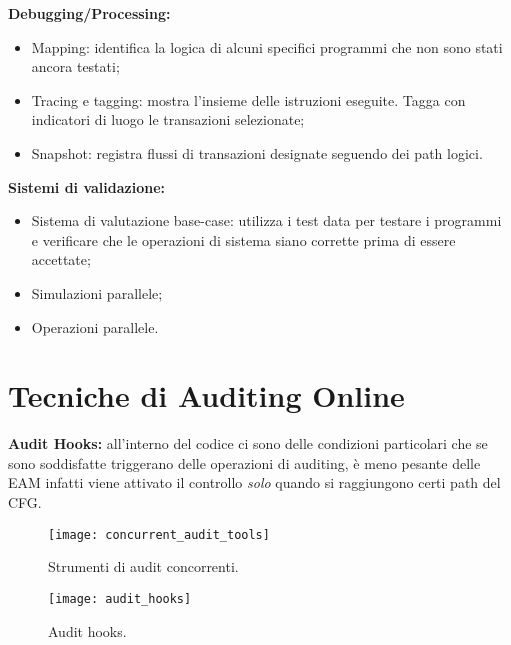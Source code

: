 \textbf{Debugging/Processing:}

\begin{itemize}
    \item Mapping: identifica la logica di alcuni specifici programmi che non
    sono stati ancora testati;
    \item Tracing e tagging: mostra l'insieme delle istruzioni eseguite. Tagga
    con indicatori di luogo le
    transazioni selezionate;
    \item Snapshot: registra flussi di transazioni designate seguendo dei path
    logici.
\end{itemize}

\textbf{Sistemi di validazione:}

\begin{itemize}
    \item Sistema di valutazione base-case: utilizza i test data per testare i
    programmi e verificare che
    le operazioni di sistema siano corrette prima di essere accettate;
    \item Simulazioni parallele;
    \item Operazioni parallele.
\end{itemize}

\section{Tecniche di Auditing Online}

\textbf{Audit Hooks:} all'interno del codice ci sono delle condizioni
particolari che se sono soddisfatte triggerano delle operazioni di auditing, è
meno pesante delle EAM infatti viene attivato il controllo \emph{solo} quando
si raggiungono certi path del CFG.

\begin{figure}[h!]
        \begin{center}
                \texttt{[image: concurrent\_audit\_tools]}
        \end{center}
        \caption{Strumenti di audit concorrenti.}
        \label{fig:concurrent:audit:tools}
\end{figure}

\begin{figure}[h!]
        \begin{center}
                \texttt{[image: audit\_hooks]}
        \end{center}
        \caption{Audit hooks.}
        \label{fig:audit:hooks}
\end{figure}

